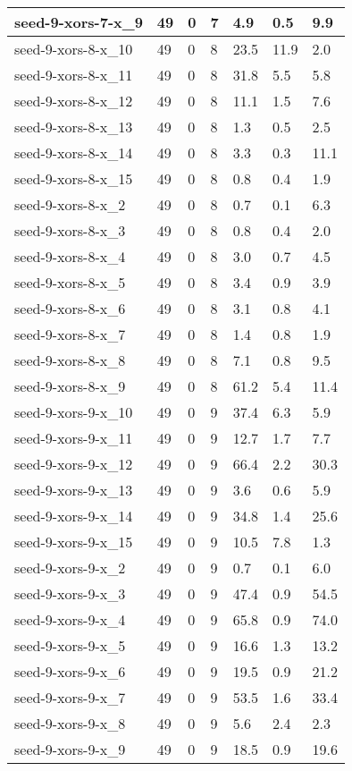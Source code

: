 \begin{scriptsize}
\begin{longtable}{|p{5cm}|l|l|l|l|l|l|}
seed-9-xors-7-x\_9&49&0&7&4.9&0.5&9.9 \\ \hline 
seed-9-xors-8-x\_10&49&0&8&23.5&11.9&2.0 \\ \hline 
seed-9-xors-8-x\_11&49&0&8&31.8&5.5&5.8 \\ \hline 
seed-9-xors-8-x\_12&49&0&8&11.1&1.5&7.6 \\ \hline 
seed-9-xors-8-x\_13&49&0&8&1.3&0.5&2.5 \\ \hline 
seed-9-xors-8-x\_14&49&0&8&3.3&0.3&11.1 \\ \hline 
seed-9-xors-8-x\_15&49&0&8&0.8&0.4&1.9 \\ \hline 
seed-9-xors-8-x\_2&49&0&8&0.7&0.1&6.3 \\ \hline 
seed-9-xors-8-x\_3&49&0&8&0.8&0.4&2.0 \\ \hline 
seed-9-xors-8-x\_4&49&0&8&3.0&0.7&4.5 \\ \hline 
seed-9-xors-8-x\_5&49&0&8&3.4&0.9&3.9 \\ \hline 
seed-9-xors-8-x\_6&49&0&8&3.1&0.8&4.1 \\ \hline 
seed-9-xors-8-x\_7&49&0&8&1.4&0.8&1.9 \\ \hline 
seed-9-xors-8-x\_8&49&0&8&7.1&0.8&9.5 \\ \hline 
seed-9-xors-8-x\_9&49&0&8&61.2&5.4&11.4 \\ \hline 
seed-9-xors-9-x\_10&49&0&9&37.4&6.3&5.9 \\ \hline 
seed-9-xors-9-x\_11&49&0&9&12.7&1.7&7.7 \\ \hline 
seed-9-xors-9-x\_12&49&0&9&66.4&2.2&30.3 \\ \hline 
seed-9-xors-9-x\_13&49&0&9&3.6&0.6&5.9 \\ \hline 
seed-9-xors-9-x\_14&49&0&9&34.8&1.4&25.6 \\ \hline 
seed-9-xors-9-x\_15&49&0&9&10.5&7.8&1.3 \\ \hline 
seed-9-xors-9-x\_2&49&0&9&0.7&0.1&6.0 \\ \hline 
seed-9-xors-9-x\_3&49&0&9&47.4&0.9&54.5 \\ \hline 
seed-9-xors-9-x\_4&49&0&9&65.8&0.9&74.0 \\ \hline 
seed-9-xors-9-x\_5&49&0&9&16.6&1.3&13.2 \\ \hline 
seed-9-xors-9-x\_6&49&0&9&19.5&0.9&21.2 \\ \hline 
seed-9-xors-9-x\_7&49&0&9&53.5&1.6&33.4 \\ \hline 
seed-9-xors-9-x\_8&49&0&9&5.6&2.4&2.3 \\ \hline 
seed-9-xors-9-x\_9&49&0&9&18.5&0.9&19.6 \\ \hline 
\end{longtable}
\end{scriptsize}
